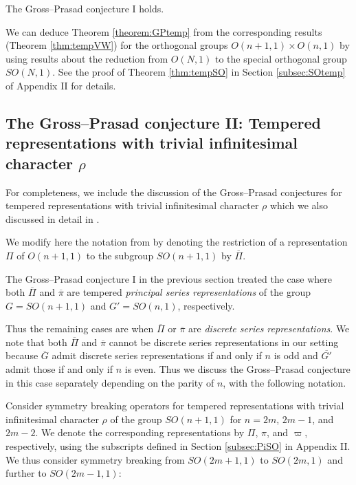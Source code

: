 \begin{theorem}
\label{theorem:GPtemp}
The Gross--Prasad conjecture I holds.  
\end{theorem}
We can deduce Theorem \ref{theorem:GPtemp} from the corresponding results
 (Theorem \ref{thm:tempVW}) for the orthogonal groups
 $O(n+1,1) \times O(n,1)$
 by using results
 about the reduction from $O(N,1)$
 to the special orthogonal group $SO(N,1)$.  
See the proof of Theorem \ref{thm:tempSO}
 in Section \ref{subsec:SOtemp}
 of Appendix II
 for details.  



\subsection{The Gross--Prasad conjecture II: 
 Tempered representations with trivial infinitesimal character
$\rho$}
\label{subsec:GPII}


For completeness,
 we include the discussion of the Gross--Prasad conjectures
 for tempered representations with trivial infinitesimal character $\rho$
 which we also discussed in detail in \cite{sbonGP}.  
\medskip

We modify here the notation from \cite{sbonGP} by denoting the restriction of a representation $\Pi$ of $O(n+1,1)$ to the subgroup $SO(n+1,1)$ by $\overline{\Pi}$.

The Gross--Prasad conjecture I in the previous section 
treated the case
 where both $\overline \Pi$ and $\overline \pi$ are tempered 
 {\it{principal series representations}}
 of the group $G=SO(n+1,1)$
 and $G'=SO(n,1)$, 
 respectively.  



Thus the remaining cases are
 when $\overline \Pi$ or $\overline \pi$ are 
 {\it{discrete series representations}}.  
We note 
 that both $\overline \Pi$ and $\overline \pi$ cannot be discrete series representations
 in our setting
 because $\overline G$ admit discrete series representations
 if and only if $n$ is odd and $\overline{G'}$ admit those 
 if and only if $n$ is even.  
Thus we discuss the Gross--Prasad conjecture
 in this case
 separately depending on the parity of $n$, 
 with the following notation.  



Consider symmetry breaking operators
 for tempered representations
 with trivial infinitesimal character $\rho$
 of the group $SO(n+1,1)$
 for $n=2m$, $2m-1$, 
 and $2m-2$.  
We denote the corresponding representations
 by $\Pi$, $\pi$, and $\varpi$, 
 respectively,
 using the subscripts
 defined in Section \ref{subsec:PiSO} in Appendix II.  
We thus consider symmetry breaking from $SO(2m+1,1)$ to $SO(2m,1)$
 and further to $SO(2m-1,1)$:



